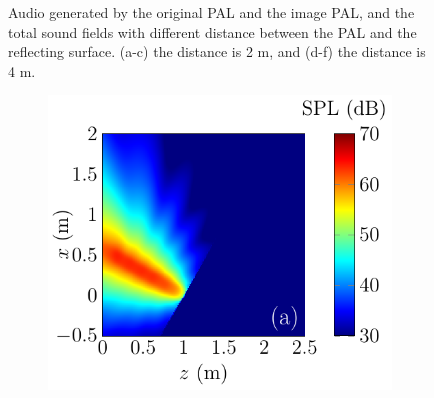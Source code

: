 \begin{figure}[!htb]
\begin{subfigure}{0.32\textwidth}
    \end{subfigure}
    \caption{Audio  generated by the original PAL and the image PAL, and the total sound fields with different distance between the PAL and the reflecting surface. (a-c) the distance is 2 m, and (d-f) the distance is 4 m.}
    \label{fig:reflection:vary_distance}
\end{figure}


\begin{figure}[!htb]
    \centering
    \begin{subfigure}{0.32\textwidth}
        \centering
        \includegraphics[width = \textwidth]{fig/ComputePalReflectionTruncated_Ultra60000_LocSurface1m_Absorp50_Orignal_211013T.pdf}
    \end{subfigure}
    \begin{subfigure}{0.32\textwidth}
        \centering

\end{subfigure}
\end{figure}
